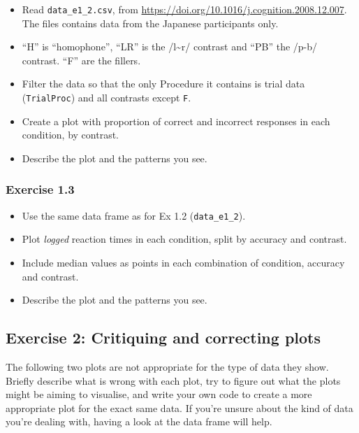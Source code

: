 \documentclass[
]{article}
\providecommand{\tightlist}{%
  \setlength{\itemsep}{0pt}\setlength{\parskip}{0pt}}
\begin{document}
\begin{itemize}
\tightlist
\item
  Read \texttt{data\_e1\_2.csv}, from
  \url{https://doi.org/10.1016/j.cognition.2008.12.007}. The files
  contains data from the Japanese participants only.
\item
  ``H'' is ``homophone'', ``LR'' is the /l\textasciitilde r/ contrast
  and ``PB'' the /p-b/ contrast. ``F'' are the fillers.
\item
  Filter the data so that the only Procedure it contains is trial data
  (\texttt{TrialProc}) and all contrasts except \texttt{F}.
\item
  Create a plot with proportion of correct and incorrect responses in
  each condition, by contrast.
\item
  Describe the plot and the patterns you see.
\end{itemize}

\subsubsection{Exercise 1.3}\label{exercise-1.3}

\begin{itemize}
\tightlist
\item
  Use the same data frame as for Ex 1.2 (\texttt{data\_e1\_2}).
\item
  Plot \emph{logged} reaction times in each condition, split by accuracy
  and contrast.
\item
  Include median values as points in each combination of condition,
  accuracy and contrast.
\item
  Describe the plot and the patterns you see.
\end{itemize}

\newpage

\subsection{Exercise 2: Critiquing and correcting
plots}\label{exercise-2-critiquing-and-correcting-plots}

The following two plots are not appropriate for the type of data they
show. Briefly describe what is wrong with each plot, try to figure out
what the plots might be aiming to visualise, and write your own code to
create a more appropriate plot for the exact same data. If you're unsure
about the kind of data you're dealing with, having a look at the data
frame will help.
\end{document}
